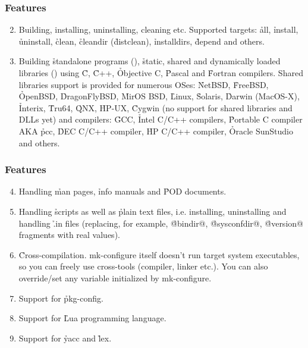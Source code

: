 \documentclass[hyperref={colorlinks=true}]{beamer}
\begin{document}
\begin{frame}[fragile,t]
  \frametitle{Features}
  \begin{block}{}
  \begin{enumerate}
  \setcounter{enumi}{1}
  \item Building, installing, uninstalling, cleaning
    etc. Supported targets: \h{all}, \h{install},
    \h{uninstall},
    \h{clean}, \h{cleandir} (\h{distclean}), \h{installdirs}, \h{depend}
    and others.
  \item Building \h{standalone programs} (),
    \h{static, shared and dynamically loaded libraries}
    () using \h{C},
    \h{C++}, \h{Objective C}, \h{Pascal} and \h{Fortran} compilers.
    Shared libraries
    support is provided for numerous OSes: \h{NetBSD}, \h{FreeBSD},
    \h{OpenBSD},
    \h{DragonFlyBSD}, \h{MirOS BSD}, \h{Linux}, \h{Solaris}, \h{Darwin}
    (MacOS-X), \h{Interix}, \h{Tru64},
    \h{QNX}, \h{HP-UX}, \h{Cygwin} (no support for shared libraries
    and DLLs yet) and
    compilers: \h{GCC}, \h{Intel C/C++} compilers, \h{Portable C compiler} AKA
    \h{pcc}, \h{DEC C/C++ compiler}, \h{HP C/C++ compiler},
    \h{Oracle SunStudio} and others.
  \end{enumerate}
  \end{block}
\end{frame}


\begin{frame}[fragile,t]
  \frametitle{Features}
  \begin{block}{}
  \begin{enumerate}
  \setcounter{enumi}{3}
  \item Handling \h{man} pages, \h{info} manuals and \h{POD} documents.
  \item Handling \h{scripts} as well as \h{plain text files},
    i.e. installing, uninstalling and handling \h{.in files}
    (replacing, for example, \h{@bindir@}, \h{@sysconfdir@}, \h{@version@}
    fragments with real values).
  \item \h{Cross-compilation}. mk-configure itself doesn't run
    target system
    executables, so you can freely use cross-tools (compiler, linker
    etc.).  You can also override/set any variable initialized by mk-configure.
  \item Support for \h{pkg-config}.
  \item Support for \h{Lua} programming language.
  \item Support for \h{yacc} and \h{lex}.
  \end{enumerate}
  \end{block}
\end{frame}
\end{document}
